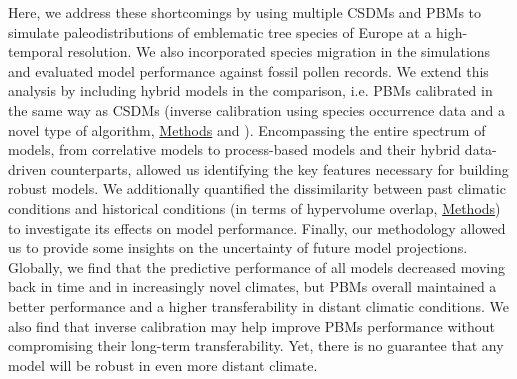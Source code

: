 \documentclass[pdflatex, sn-nature]{sn-jnl}%
\begin{document}
Here, we address these shortcomings by using multiple CSDMs and PBMs to simulate paleodistributions of emblematic tree species of Europe at a high-temporal resolution. We also incorporated species migration in the simulations and evaluated model performance against fossil pollen records. We extend this analysis by including hybrid models in the comparison, i.e. PBMs calibrated in the same way as CSDMs (inverse calibration using species occurrence data and a novel type of algorithm, \hyperref[methods]{Methods} and \citep{VanderMeersch2023}). Encompassing the entire spectrum of models, from correlative models to process-based models and their hybrid data-driven counterparts, allowed us identifying the key features necessary for building robust models. We additionally quantified the dissimilarity between past climatic conditions and historical conditions (in terms of hypervolume overlap, \hyperref[methods]{Methods}) to investigate its effects on model performance. Finally, our methodology allowed us to provide some insights on the uncertainty of future model projections. 
Globally, we find that the predictive performance of all models decreased moving back in time and in increasingly novel climates, but PBMs overall maintained a better performance and a higher transferability in distant climatic conditions. We also find that inverse calibration may help improve PBMs performance without compromising their long-term transferability. Yet, there is no guarantee that any model will be robust in even more distant climate. 
\end{document}
